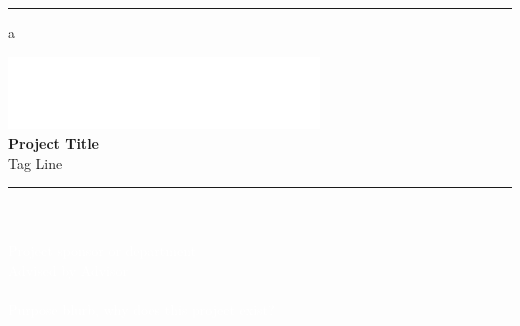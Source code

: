 \documentclass[oneside]{book}
\begin{document}

\begin{titlepage}
    \pagecolor{WITGrey}\afterpage{\pagecolor{white}}
    \thispagestyle{empty}
    \hspace*{-.605cm}
    \begin{minipage}[t][.99\paperheight][b]{1.33 in}
        \textcolor{WITYellow}{\rule{1.331 in}{2\paperheight}}
    \end{minipage}\begin{minipage}{.53 in}
    \textcolor{WITGrey}{a}
    \end{minipage}\begin{minipage}[t]{6.2 in}
        \vspace*{.49 in}
        \hspace{\fill}  \href{www.wit.edu}{\includegraphics*[width=3.25in]{WIT-Full-Wordmark_White_PNG.png}}\\[35ex]
        \fontsize{55pt}{12pt}\selectfont
        \textcolor{WITYellow}{\bfseries{Project Title}}\\[1.25ex]
        \fontsize{25pt}{12pt}\selectfont
        \textcolor{WITYellow}{Tag Line}\\[.75ex]
        \textcolor{WITYellow}{\rule{\textwidth}{.15cm}}\\[2ex]
        \textcolor{white}{}\\[1.5ex]
        \fontsize{15pt}{12pt}\selectfont
        \textcolor{white}{Project sponsor or department}\\[.5ex]
        \textcolor{white}{Advised by Advisor}\\[20ex]
        \fontsize{16pt}{12pt}\selectfont
        \textcolor{white}{}\\[3ex]
        \fontsize{10pt}{12pt}\selectfont
        \textcolor{white}{Purpose blurb, why does this project exist?}
\end{minipage}\begin{minipage}{0.41 in}

\end{minipage}
\end{titlepage}

\restoregeometry
\frontmatter
    
    
    \fontsize{10pt}{12pt}\selectfont
    \tableofcontents
\end{document}
